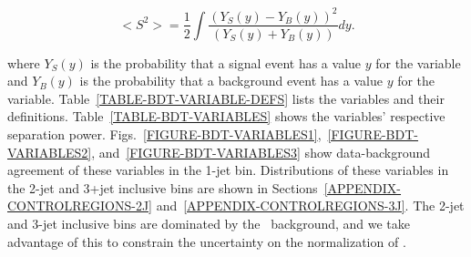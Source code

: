 \begin{equation}
<S^2> = \frac{1}{2}  \int{\frac{(Y_S(y) - Y_B(y))^2}{(Y_S(y)+Y_B(y))} dy}.
\end{equation}

\noindent
where $Y_{S}(y)$ is the probability that a signal event has a value $y$ for the variable and $Y_{B}(y)$ is the probability that a background event has a value $y$ for the variable. Table~\ref{TABLE-BDT-VARIABLE-DEFS} lists the variables and their definitions. Table~\ref{TABLE-BDT-VARIABLES} shows the variables' respective separation power. Figs.~\ref{FIGURE-BDT-VARIABLES1},~\ref{FIGURE-BDT-VARIABLES2}, and~\ref{FIGURE-BDT-VARIABLES3} show data-background agreement of these variables in the 1-jet bin. Distributions of these variables in the 2-jet and 3+jet inclusive bins are shown in Sections~\ref{APPENDIX-CONTROLREGIONS-2J} and~\ref{APPENDIX-CONTROLREGIONS-3J}. The 2-jet and 3-jet inclusive bins are dominated by the \ttbar\ background, and we take advantage of this to constrain the uncertainty on the normalization of \ttbar.

